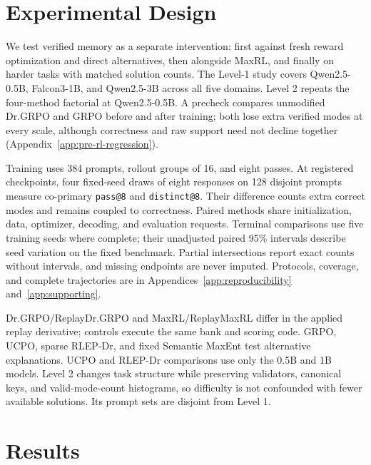\section{Experimental Design}
\label{sec:experiments}

We test verified memory as a separate intervention: first against fresh
reward optimization and direct alternatives, then alongside MaxRL, and
finally on harder tasks with matched solution counts. The Level-1 study
covers Qwen2.5-0.5B, Falcon3-1B, and Qwen2.5-3B across all five domains.
Level 2 repeats the four-method factorial at Qwen2.5-0.5B. A precheck
compares unmodified Dr.GRPO and GRPO before and after training; both lose
extra verified modes at every scale, although correctness and raw support
need not decline together (Appendix~\ref{app:pre-rl-regression}).

\label{sec:shared-protocol}
Training uses 384 prompts, rollout groups of 16, and eight passes.
At registered checkpoints, four fixed-seed draws of eight responses on
128 disjoint prompts measure co-primary \texttt{pass@8} and
\texttt{distinct@8}. Their difference counts extra correct modes and
remains coupled to correctness. Paired methods share initialization,
data, optimizer, decoding, and evaluation requests. Terminal comparisons
use five training seeds where complete; their unadjusted paired 95\%
intervals describe seed variation on the fixed benchmark. Partial
intersections report exact counts without intervals, and missing endpoints
are never imputed. Protocols, coverage, and complete trajectories are in
Appendices~\ref{app:reproducibility} and~\ref{app:supporting}.

\label{sec:retention-design}
\label{sec:factorial-design}
Dr.GRPO/ReplayDr.GRPO and MaxRL/ReplayMaxRL differ in the applied replay
derivative; controls execute the same bank and scoring code. GRPO, UCPO,
sparse RLEP-Dr, and fixed Semantic MaxEnt test alternative explanations.
UCPO and RLEP-Dr comparisons use only the 0.5B and 1B models.
\label{sec:levels-design}
Level 2 changes task structure while preserving validators, canonical keys,
and valid-mode-count histograms, so difficulty is not confounded with fewer
available solutions. Its prompt sets are disjoint from Level 1.

\section{Results}
\label{sec:results}

